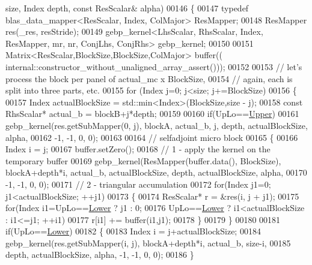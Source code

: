 \begin{DoxyCode}
       size, Index depth, \textcolor{keyword}{const} ResScalar& alpha)
00146   \{
00147     \textcolor{keyword}{typedef} blas\_data\_mapper<ResScalar, Index, ColMajor> ResMapper;
00148     ResMapper res(\_res, resStride);
00149     gebp\_kernel<LhsScalar, RhsScalar, Index, ResMapper, mr, nr, ConjLhs, ConjRhs> gebp\_kernel;
00150 
00151     Matrix<ResScalar,BlockSize,BlockSize,ColMajor> buffer((
      internal::constructor\_without\_unaligned\_array\_assert()));
00152 
00153     \textcolor{comment}{// let's process the block per panel of actual\_mc x BlockSize,}
00154     \textcolor{comment}{// again, each is split into three parts, etc.}
00155     \textcolor{keywordflow}{for} (Index j=0; j<size; j+=BlockSize)
00156     \{
00157       Index actualBlockSize = std::min<Index>(BlockSize,size - j);
00158       \textcolor{keyword}{const} RhsScalar* actual\_b = blockB+j*depth;
00159 
00160       \textcolor{keywordflow}{if}(UpLo==\hyperlink{group__enums_gga39e3366ff5554d731e7dc8bb642f83cda6bcb58be3b8b8ec84859ce0c5ac0aaec}{Upper})
00161         gebp\_kernel(res.getSubMapper(0, j), blockA, actual\_b, j, depth, actualBlockSize, alpha,
00162                     -1, -1, 0, 0);
00163 
00164       \textcolor{comment}{// selfadjoint micro block}
00165       \{
00166         Index i = j;
00167         buffer.setZero();
00168         \textcolor{comment}{// 1 - apply the kernel on the temporary buffer}
00169         gebp\_kernel(ResMapper(buffer.data(), BlockSize), blockA+depth*i, actual\_b, actualBlockSize, depth, 
      actualBlockSize, alpha,
00170                     -1, -1, 0, 0);
00171         \textcolor{comment}{// 2 - triangular accumulation}
00172         \textcolor{keywordflow}{for}(Index j1=0; j1<actualBlockSize; ++j1)
00173         \{
00174           ResScalar* r = &res(i, j + j1);
00175           \textcolor{keywordflow}{for}(Index i1=UpLo==\hyperlink{group__enums_gga39e3366ff5554d731e7dc8bb642f83cda891792b8ed394f7607ab16dd716f60e6}{Lower} ? j1 : 0;
00176               UpLo==\hyperlink{group__enums_gga39e3366ff5554d731e7dc8bb642f83cda891792b8ed394f7607ab16dd716f60e6}{Lower} ? i1<actualBlockSize : i1<=j1; ++i1)
00177             r[i1] += buffer(i1,j1);
00178         \}
00179       \}
00180 
00181       \textcolor{keywordflow}{if}(UpLo==\hyperlink{group__enums_gga39e3366ff5554d731e7dc8bb642f83cda891792b8ed394f7607ab16dd716f60e6}{Lower})
00182       \{
00183         Index i = j+actualBlockSize;
00184         gebp\_kernel(res.getSubMapper(i, j), blockA+depth*i, actual\_b, size-i, 
00185                     depth, actualBlockSize, alpha, -1, -1, 0, 0);
00186       \}

\end{DoxyCode}
